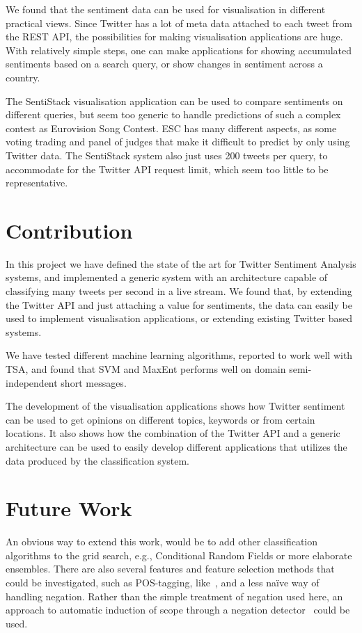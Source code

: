 We found that the sentiment data can be used for visualisation in different practical views. Since Twitter has a lot of meta data attached to each tweet from the REST API, the possibilities for making visualisation applications are huge. With relatively simple steps, one can make applications for showing accumulated sentiments based on a search query, or show changes in sentiment across a country.

The SentiStack visualisation application can be used to compare sentiments on different queries, but seem too generic to handle predictions of such a complex contest as Eurovision Song Contest. ESC has many different aspects, as some voting trading and panel of judges that make it difficult to predict by only using Twitter data. The SentiStack system also just uses 200 tweets per query, to accommodate for the Twitter API request limit, which seem too little to be representative.

\section{Contribution}

In this project we have defined the state of the art for Twitter Sentiment Analysis systems, and implemented a generic system with an architecture capable of classifying many tweets per second in a live stream. We found that, by extending the Twitter API and just attaching a value for sentiments, the data can easily be used to implement visualisation applications, or extending existing Twitter based systems. 

We have tested different machine learning algorithms, reported to work well with TSA, and found that SVM and MaxEnt performs well on domain semi-independent short messages.

The development of the visualisation applications shows how Twitter sentiment can be used to get opinions on different topics, keywords or from certain locations. It also shows how the combination of the Twitter API and a generic architecture can be used to easily develop different applications that utilizes the data produced by the classification system.

\section{Future Work}

An obvious way to extend this work, would be to add other classification algorithms to the grid search, e.g., Conditional Random Fields or more elaborate ensembles. There are also several
features and feature selection methods that could be investigated, such as POS-tagging, like~\cite{article:pak}, and a less na\"{i}ve way of handling negation. Rather than the simple treatment of negation used here, an approach to automatic induction of scope through a negation detector~\citep{CouncillEA:10} could be used.

